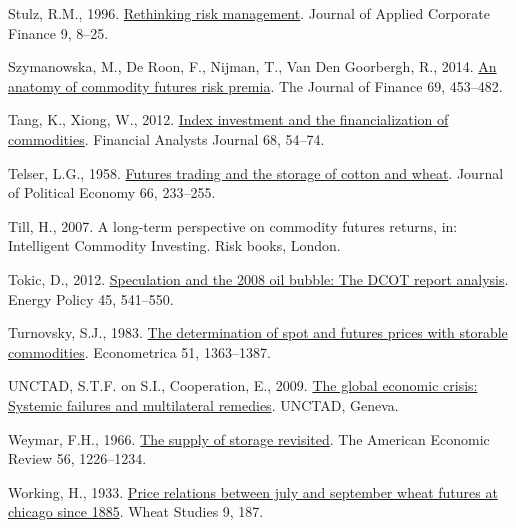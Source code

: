 \documentclass[]{elsarticle} %
\newlength{\cslhangindent}
\newlength{\cslentryspacingunit} %
\newenvironment{CSLReferences}[2] %
 {%
  \setlength{\parindent}{0pt}
  \ifodd #1
  \let\oldpar\par
  \def\par{\hangindent=\cslhangindent\oldpar}
  \fi
  \setlength{\parskip}{#2\cslentryspacingunit}
 }%
 {}
\begin{document}
\begin{CSLReferences}{1}{0}
\leavevmode{}%
Stulz, R.M., 1996. \href{https://doi.org/10.1111/j.1745-6622.1996.tb00295.x}{Rethinking risk management}. Journal of Applied Corporate Finance 9, 8--25.

\leavevmode{}%
Szymanowska, M., De Roon, F., Nijman, T., Van Den Goorbergh, R., 2014. \href{https://doi.org/10.1111/jofi.12096}{An anatomy of commodity futures risk premia}. The Journal of Finance 69, 453--482.

\leavevmode{}%
Tang, K., Xiong, W., 2012. \href{https://doi.org/10.2469/faj.v68.n6.5}{Index investment and the financialization of commodities}. Financial Analysts Journal 68, 54--74.

\leavevmode{}%
Telser, L.G., 1958. \href{https://doi.org/10.1086/258036}{Futures trading and the storage of cotton and wheat}. Journal of Political Economy 66, 233--255.

\leavevmode{}%
Till, H., 2007. A long-term perspective on commodity futures returns, in: Intelligent Commodity Investing. Risk books, London.

\leavevmode{}%
Tokic, D., 2012. \href{https://doi.org/10.1016/j.enpol.2012.02.069}{Speculation and the 2008 oil bubble: The DCOT report analysis}. Energy Policy 45, 541--550.

\leavevmode{}%
Turnovsky, S.J., 1983. \href{https://doi.org/10.2307/1912279}{The determination of spot and futures prices with storable commodities}. Econometrica 51, 1363--1387.

\leavevmode{}%
UNCTAD, S.T.F. on S.I., Cooperation, E., 2009. \href{https://unctad.org/system/files/official-document/gds20091_en.pdf}{The global economic crisis: Systemic failures and multilateral remedies}. UNCTAD, Geneva.

\leavevmode{}%
Weymar, F.H., 1966. \href{http://www.jstor.org/stable/1815306}{The supply of storage revisited}. The American Economic Review 56, 1226--1234.

\leavevmode{}%
Working, H., 1933. \href{https://doi.org/10.22004/ag.econ.142876}{Price relations between july and september wheat futures at chicago since 1885}. Wheat Studies 9, 187.


\end{CSLReferences}
\end{document}
